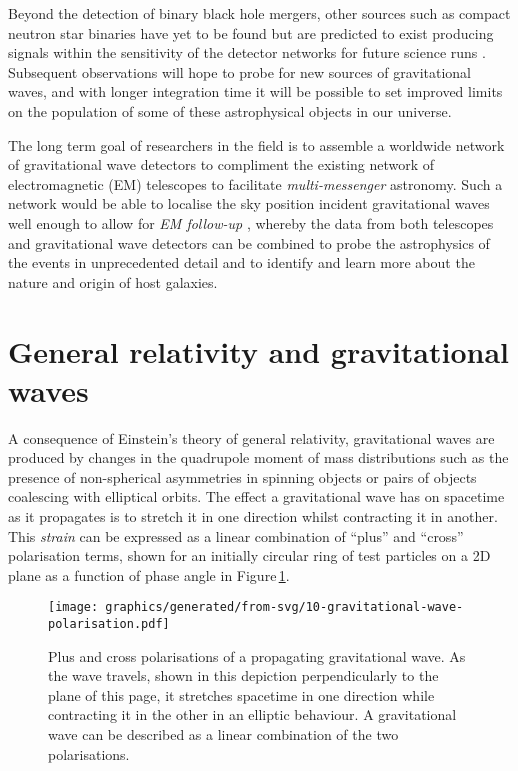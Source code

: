 Beyond the detection of binary black hole mergers, other sources such as compact neutron star binaries have yet to be found but are predicted to exist producing signals within the sensitivity of the detector networks for future science runs \cite{Abbott2016f}. Subsequent observations will hope to probe for new sources of gravitational waves, and with longer integration time it will be possible to set improved limits on the population of some of these astrophysical objects in our universe.

The long term goal of researchers in the field is to assemble a worldwide network of gravitational wave detectors to compliment the existing network of electromagnetic (\gls{EM}) telescopes to facilitate \emph{multi-messenger} astronomy. Such a network would be able to localise the sky position incident gravitational waves well enough to allow for \emph{\gls{EM} follow-up} \cite{Abbott2016e, Abbott2016f}, whereby the data from both telescopes and gravitational wave detectors can be combined to probe the astrophysics of the events in unprecedented detail and to identify and learn more about the nature and origin of host galaxies.

\section{General relativity and gravitational waves}
A consequence of Einstein's theory of general relativity, gravitational waves are produced by changes in the quadrupole moment of mass distributions such as the presence of non-spherical asymmetries in spinning objects or pairs of objects coalescing with elliptical orbits. The effect a gravitational wave has on spacetime as it propagates is to stretch it in one direction whilst contracting it in another. This \emph{strain} can be expressed as a linear combination of ``plus'' and ``cross'' polarisation terms, shown for an initially circular ring of test particles on a 2D plane as a function of phase angle in Figure\,\ref{fig:gravitational-wave-polarisation}.

\begin{figure}
  \centering
  \texttt{[image: graphics/generated/from-svg/10-gravitational-wave-polarisation.pdf]}
  \caption[Plus and cross polarisations of a propagating gravitational wave]{\label{fig:gravitational-wave-polarisation}Plus and cross polarisations of a propagating gravitational wave. As the wave travels, shown in this depiction perpendicularly to the plane of this page, it stretches spacetime in one direction while contracting it in the other in an elliptic behaviour. A gravitational wave can be described as a linear combination of the two polarisations.}
\end{figure}

